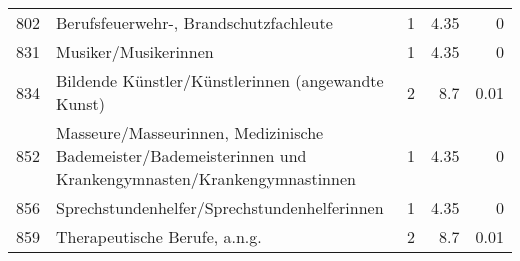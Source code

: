 \begin{longtable}{lXrrr}
     802 &
     \multicolumn{1}{X}{ Berufsfeuerwehr-, Brandschutzfachleute   } &


       \num{1} &
       \num[round-mode=places,round-precision=2]{4,35} &
         \num[round-mode=places,round-precision=2]{0} \\

     831 &
     \multicolumn{1}{X}{ Musiker/Musikerinnen   } &


       \num{1} &
       \num[round-mode=places,round-precision=2]{4,35} &
         \num[round-mode=places,round-precision=2]{0} \\

     834 &
     \multicolumn{1}{X}{ Bildende Künstler/Künstlerinnen (angewandte Kunst)   } &


       \num{2} &
       \num[round-mode=places,round-precision=2]{8,7} &
         \num[round-mode=places,round-precision=2]{0,01} \\

     852 &
     \multicolumn{1}{X}{ Masseure/Masseurinnen, Medizinische Bademeister/Bademeisterinnen und Krankengymnasten/Krankengymnastinnen   } &


       \num{1} &
       \num[round-mode=places,round-precision=2]{4,35} &
         \num[round-mode=places,round-precision=2]{0} \\

     856 &
     \multicolumn{1}{X}{ Sprechstundenhelfer/Sprechstundenhelferinnen   } &


       \num{1} &
       \num[round-mode=places,round-precision=2]{4,35} &
         \num[round-mode=places,round-precision=2]{0} \\

     859 &
     \multicolumn{1}{X}{ Therapeutische Berufe, a.n.g.   } &


       \num{2} &
       \num[round-mode=places,round-precision=2]{8,7} &
         \num[round-mode=places,round-precision=2]{0,01} \\


\end{longtable}
